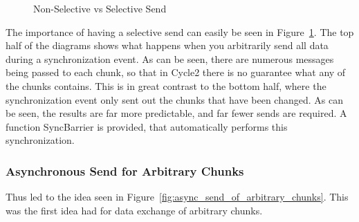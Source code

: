 \documentclass[../thesis.tex]{subfiles}
\begin{document}
\begin{figure}[htbp]

      \caption{Non-Selective vs Selective Send}
      \label{fig:selective_send}
    \end{figure}

    The importance of having a selective send can easily be seen in Figure~\ref{fig:selective_send}. The top half of the diagrams shows what happens when you arbitrarily send all data during a synchronization event. As can be seen, there are numerous messages being passed to each chunk, so that in Cycle2 there is no guarantee what any of the chunks contains. This is in great contrast to the bottom half, where the synchronization event only sent out the chunks that have been changed. As can be seen, the results are far more predictable, and far fewer sends are required. A function SyncBarrier is provided, that automatically performs this synchronization.


  \subsubsection{Asynchronous Send for Arbitrary Chunks} %
  \label{ssub:asynchronous_send_for_arbitrary_chunks}
   

    Thus led to the idea seen in Figure~\ref{fig:async_send_of_arbitrary_chunks}. This was the first idea had for data exchange of arbitrary chunks.
\end{document}
